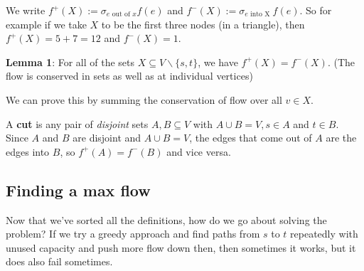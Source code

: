 \documentclass[11pt,a4paper,titlepage,dvipsnames,cmyk]{scrartcl}
\begin{document}
\begin{figure}[htpb]
\begin{center}
\end{center}
\end{figure}


We write $f^+(X) := \sigma_{e \text{ out of } x} f(e)$ and $f^-(X) :=
\sigma_{e \text{ into X }} f(e)$. So for example if we take $X$ to be the
first three nodes (in a triangle), then $f^+(X) = 5 + 7 = 12$ and $f^-(X)
= 1$.

\textbf{Lemma 1}: For all of the sets $X \subseteq V \backslash \{s,t\}$,
we have $f^+(X) = f^-(X)$. (The flow is conserved in sets as well as at
individual vertices)

We can prove this by summing the conservation of flow over all $v \in X$.

A \textbf{cut} is any pair of \textit{disjoint} sets $A,B \subseteq V$
with $A \cup B = V, s \in A$ and $t \in B$. Since $A$ and $B$ are
disjoint and $A \cup B = V$, the edges that come out of $A$ are the edges
into $B$, so $f^+(A) = f^-(B)$ and vice versa.

\subsection{Finding a max flow}%
\label{sub:max-flow}
Now that we've sorted all the definitions, how do we go about solving the
problem? If we try a greedy approach and find paths from $s$ to $t$
repeatedly with unused capacity and push more flow down then, then
sometimes it works, but it does also fail sometimes.
\end{document}
